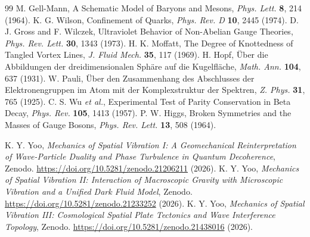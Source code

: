 \documentclass[reprint,amsmath,amssymb,aps,prd]{revtex4-2}
\begin{document}
\begin{thebibliography}{99}
 M. Gell-Mann, A Schematic Model of Baryons and Mesons, \textit{Phys. Lett.} \textbf{8}, 214 (1964).
 K. G. Wilson, Confinement of Quarks, \textit{Phys. Rev. D} \textbf{10}, 2445 (1974).
 D. J. Gross and F. Wilczek, Ultraviolet Behavior of Non-Abelian Gauge Theories, \textit{Phys. Rev. Lett.} \textbf{30}, 1343 (1973).
 H. K. Moffatt, The Degree of Knottedness of Tangled Vortex Lines, \textit{J. Fluid Mech.} \textbf{35}, 117 (1969).
 H. Hopf, \"{U}ber die Abbildungen der dreidimensionalen Sph\"{a}re auf die Kugelfl\"{a}che, \textit{Math. Ann.} \textbf{104}, 637 (1931).
 W. Pauli, \"{U}ber den Zusammenhang des Abschlusses der Elektronengruppen im Atom mit der Komplexstruktur der Spektren, \textit{Z. Phys.} \textbf{31}, 765 (1925).
 C. S. Wu \textit{et al.}, Experimental Test of Parity Conservation in Beta Decay, \textit{Phys. Rev.} \textbf{105}, 1413 (1957).
 P. W. Higgs, Broken Symmetries and the Masses of Gauge Bosons, \textit{Phys. Rev. Lett.} \textbf{13}, 508 (1964).

 K. Y. Yoo, \textit{Mechanics of Spatial Vibration I: A Geomechanical Reinterpretation of Wave-Particle Duality and Phase Turbulence in Quantum Decoherence}, Zenodo. \url{https://doi.org/10.5281/zenodo.21206211} (2026).
 K. Y. Yoo, \textit{Mechanics of Spatial Vibration II: Interaction of Macroscopic Gravity with Microscopic Vibration and a Unified Dark Fluid Model}, Zenodo. \url{https://doi.org/10.5281/zenodo.21233252} (2026).
 K. Y. Yoo, \textit{Mechanics of Spatial Vibration III: Cosmological Spatial Plate Tectonics and Wave Interference Topology}, Zenodo. \url{https://doi.org/10.5281/zenodo.21438016} (2026).
\end{thebibliography}
\end{document}
